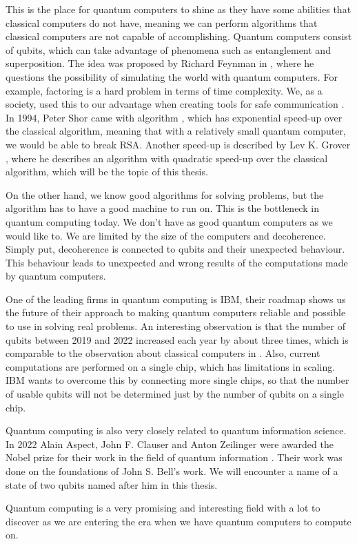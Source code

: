This is the place for quantum computers to shine as they have some abilities that classical computers do not have, meaning we can perform algorithms that classical computers are not capable of accomplishing. Quantum computers consist of qubits, which can take advantage of phenomena such as entanglement and superposition. The idea was proposed by Richard Feynman in \cite{feynman2018simulating}, where he questions the possibility of simulating the world with quantum computers. For example, factoring is a hard problem in terms of time complexity. We, as a society, used this to our advantage when creating tools for safe communication \cite{rsa}. In 1994, Peter Shor came with algorithm \cite{shor}, which has exponential speed-up over the classical algorithm, meaning that with a relatively small quantum computer, we would be able to break RSA. Another speed-up is described by Lev K. Grover \cite{grover1996fast}, where he describes an algorithm with quadratic speed-up over the classical algorithm, which will be the topic of this thesis.

On the other hand, we know good algorithms for solving problems, but the algorithm has to have a good machine to run on. This is the bottleneck in quantum computing today. We don't have as good quantum computers as we would like to. We are limited by the size of the computers and decoherence. Simply put, decoherence is connected to qubits and their unexpected behaviour. This behaviour leads to unexpected and wrong results of the computations made by quantum computers. 

One of the leading firms in quantum computing is IBM, their roadmap \cite{roadmap} shows us the future of their approach to making quantum computers reliable and possible to use in solving real problems. An interesting observation is that the number of qubits between 2019 and 2022 increased each year by about three times, which is comparable to the observation about classical computers in \cite{moore:1965} . Also, current computations are performed on a single chip, which has limitations in scaling. IBM wants to overcome this by connecting more single chips, so that the number of usable qubits will not be determined just by the number of qubits on a single chip.

Quantum computing is also very closely related to quantum information science. In 2022 Alain Aspect, John F. Clauser and Anton Zeilinger were awarded the Nobel prize for their work in the field of quantum information \cite{nobel}. Their work was done on the foundations of John S. Bell's work. We will encounter a name of a state of two qubits named after him in this thesis.

Quantum computing is a very promising and interesting field with a lot to discover as we are entering the era when we have quantum computers to compute on. 